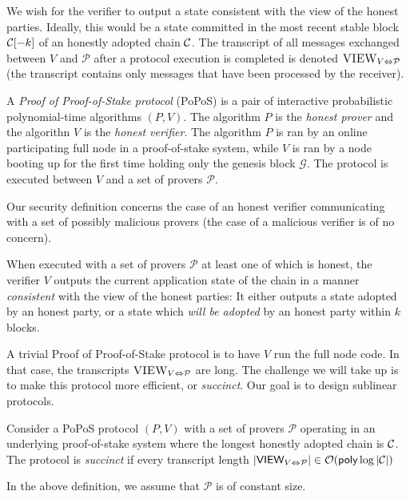 We wish for the verifier to output a state consistent with the view of the honest parties.
Ideally, this would be a state committed in the most recent stable block $\mathcal{C}[-k]$ of
an honestly adopted chain $\mathcal{C}$.
The transcript of all messages exchanged between $V$ and $\mathcal{P}$ after a protocol
execution is completed is denoted $\textsc{VIEW}_{V \Leftrightarrow \mathcal{P}}$
(the transcript contains only messages that have been processed by the receiver).

\begin{definition}
  A \emph{Proof of Proof-of-Stake protocol} (PoPoS) is a pair of interactive probabilistic polynomial-time
  algorithms $(P, V)$. The algorithm $P$ is the \emph{honest prover} and the algorithn $V$
  is the \emph{honest verifier}. The algorithm $P$ is ran by an online participating full node
  in a proof-of-stake system, while $V$ is ran by a node booting up for the first time
  holding only the genesis block $\mathcal{G}$. The protocol is executed between $V$ and a
  set of provers $\mathcal{P}$.
\end{definition}

Our security definition concerns the case of an honest verifier communicating with
a set of possibly malicious provers (the case of a malicious verifier is of no concern).

\begin{definition}[Security]
  When executed with a set of provers $\mathcal{P}$ at least one of which is honest,
  the verifier $V$ outputs the current application state of the chain in a manner
  \emph{consistent} with the view of the honest parties: It either outputs a state
  adopted by an honest party, or a state which \emph{will be adopted} by an honest party
  within $k$ blocks.
\end{definition}

A trivial Proof of Proof-of-Stake protocol is to have $V$ run the full node code. In
that case, the transcripts $\textsc{VIEW}_{V \Leftrightarrow \mathcal{P}}$ are long.
The challenge we will take up is to make this protocol more efficient, or \emph{succinct}.
Our goal is to design sublinear protocols.

\begin{definition}[Succinctness]
  Consider a PoPoS protocol $(P, V)$ with a set of provers $\mathcal{P}$ operating in
  an underlying proof-of-stake system where the longest honestly adopted chain is $\mathcal{C}$.
  The protocol is \emph{succinct} if every transcript length
  $|\textsf{VIEW}_{V \Leftrightarrow \mathcal{P}}| \in \mathcal{O}(\textsf{poly}\log|\mathcal{C}|)$
\end{definition}

In the above definition, we assume that $\mathcal{P}$ is of constant size.
